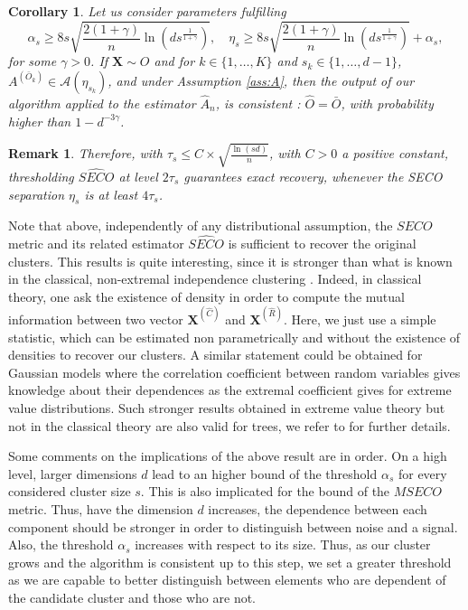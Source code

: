 \documentclass[11pt]{article}
\newtheorem{corollary}{Corollary}
\newtheorem{remark}{Remark}
\begin{document}
	\begin{corollary}
		\label{corr:exact_recovery}
		Let us consider parameters fulfilling 
		\begin{equation*}
		\alpha_s \geq 8 s \sqrt{\frac{2(1+\gamma)}{n} \ln\left(d s^{\frac{1}{1+\gamma}}\right)}, \quad \eta_{s} \geq 8 s \sqrt{\frac{2(1+\gamma)}{n} \ln\left(d s^{\frac{1}{1+\gamma}}\right)} + \alpha_s,
		\end{equation*}
		for some $\gamma > 0$. If $\textbf{X} \sim O$ and for $k \in \{1,\dots, K\}$ and $s_k \in \{1, \dots, d-1\}$, $A^{(\bar{O}_k)} \in \mathcal{A}(\eta_{s_k})$, and under Assumption \ref{ass:A}, then the output of our algorithm applied to the estimator $\hat{A}_n$, is consistent : $\hat{O} = \bar{O}$, with probability higher than $1-d^{-3\gamma}$.
	\end{corollary}
	
	\begin{remark}
		Therefore, with $\tau_s \leq C \times \sqrt{\frac{\ln(sd)}{n}}$, with $C > 0$ a positive constant, thresholding $\widehat{SECO}$ at level $2\tau_s$ guarantees exact recovery, whenever the SECO separation $\eta_s$ is at least $4 \tau_s$.
	\end{remark}
	Note that above, independently of any distributional assumption, the $SECO$ metric and its related estimator $\widehat{SECO}$ is sufficient to recover the original clusters. This results is quite interesting, since it is stronger than what is known in the classical, non-extremal independence clustering \cite{NIPS2017_37d097ca}. Indeed, in classical theory, one ask the existence of density in order to compute the mutual information between two vector $\textbf{X}^{(\hat{C})}$ and $\textbf{X}^{(\hat{R})}$. Here, we just use a simple statistic, which can be estimated non parametrically and without the existence of densities to recover our clusters. A similar statement could be obtained for Gaussian models where the correlation coefficient between random variables gives knowledge about their dependences as the extremal coefficient gives for extreme value distributions. Such stronger results obtained in extreme value theory but not in the classical theory are also valid for trees, we refer to \cite{engelke2020structure} for further details.
	
	Some comments on the implications of the above result are in order. On a high level, larger dimensions $d$ lead to an higher bound of the threshold $\alpha_s$ for every considered cluster size $s$. This is also implicated for the bound of the $MSECO$ metric. Thus, have the dimension $d$ increases, the dependence between each component should be stronger in order to distinguish between noise and a signal. Also, the threshold $\alpha_s$ increases with respect to its size. Thus, as our cluster grows and the algorithm is consistent up to this step, we set a greater threshold as we are capable to better distinguish between elements who are dependent of the candidate cluster and those who are not.
	
    
    
\end{document}
